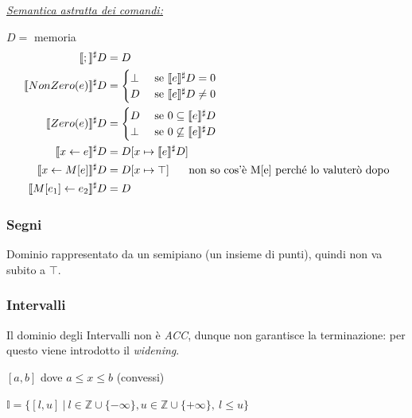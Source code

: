 \documentclass{article}
\begin{document}
                \underline{\textit{Semantica astratta dei comandi:}}

                $D =$ memoria
                \begin{align*}
                    \llbracket ; \rrbracket^\sharp D &= D\\
                    \llbracket NonZero(e) \rrbracket^\sharp D &=
                    \begin{cases}
                        \bot &\text{ se } \llbracket e\rrbracket^\sharp D = 0 \\
                        D &\text{ se } \llbracket e\rrbracket^\sharp D \neq 0
                    \end{cases}\\
                    \llbracket Zero(e) \rrbracket^\sharp D &=
                    \begin{cases}
                        D &\text{ se } 0\subseteq \llbracket e\rrbracket^\sharp D \\
                        \bot &\text{ se } 0\not\subseteq \llbracket e\rrbracket^\sharp D
                    \end{cases}\\
                    \llbracket x\leftarrow e \rrbracket^\sharp D &= D[x\mapsto \llbracket e\rrbracket^\sharp D]\\
                    \llbracket x\leftarrow M[e] \rrbracket^\sharp D &= D[x\mapsto \top] \text{\hspace{0.5cm} non so cos'è M[e] perché lo valuterò dopo}\\
                    \llbracket M[e_1]\leftarrow e_2 \rrbracket^\sharp D &= D
                \end{align*}

            \subsubsection{Segni}
                Dominio rappresentato da un semipiano (un insieme di punti), quindi non va subito a $\top$.

            \subsubsection{Intervalli}
                Il dominio degli Intervalli non è \textit{ACC}, dunque non garantisce la terminazione: per questo viene introdotto il \textit{widening}.

                \begin{center}
                    $[a, b]$ dove $a\leq x\leq b$ (convessi)
                    
                    $\mathbb{I} = \{[l, u] ~|~ l\in \mathbb{Z}\cup \{-\infty\}, u\in\mathbb{Z}\cup \{+\infty\}, ~l\leq u\}$
                \end{center}
\end{document}
